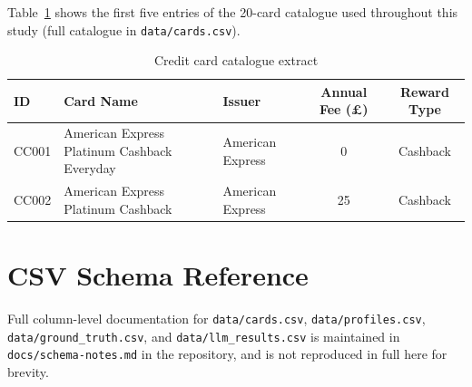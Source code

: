 Table~\ref{tab:cards-extract} shows the first five entries of the 20-card catalogue used throughout this study (full catalogue in \texttt{data/cards.csv}).

\begin{table}[htbp]
\centering
\small
\caption{Credit card catalogue extract}
\label{tab:cards-extract}
\begin{tabular}{lllcc}
\toprule
ID & Card Name & Issuer & Annual Fee (£) & Reward Type \\
\midrule
CC001 & American Express Platinum Cashback Everyday & American Express & 0  & Cashback \\
CC002 & American Express Platinum Cashback          & American Express & 25 & Cashback \\
\bottomrule
\end{tabular}
\end{table}

\chapter{CSV Schema Reference}

Full column-level documentation for \texttt{data/cards.csv}, \texttt{data/profiles.csv}, \texttt{data/ground\_truth.csv}, and \texttt{data/llm\_results.csv} is maintained in \texttt{docs/schema-notes.md} in the repository, and is not reproduced in full here for brevity.
